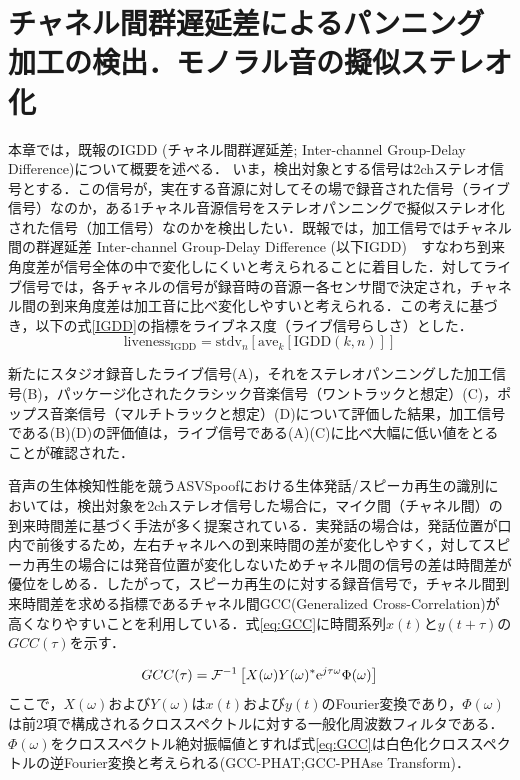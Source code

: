 \documentclass[technicalreport]{ieicej}
\begin{document}
\section{チャネル間群遅延差によるパンニング加工の検出．モノラル音の擬似ステレオ化}
本章では，既報\cite{kuroda_EMM201903}のIGDD (チャネル間群遅延差; Inter-channel Group-Delay Difference)について概要を述べる．
いま，検出対象とする信号は2chステレオ信号とする．この信号が，実在する音源に対してその場で録音された信号（ライブ信号）なのか，ある1チャネル音源信号をステレオパンニングで擬似ステレオ化された信号（加工信号）なのかを検出したい．既報では，加工信号ではチャネル間の群遅延差 Inter-channel Group-Delay Difference (以下IGDD)　すなわち到来角度差が信号全体の中で変化しにくいと考えられることに着目した．対してライブ信号では，各チャネルの信号が録音時の音源ー各センサ間で決定され，チャネル間の到来角度差は加工音に比べ変化しやすいと考えられる．この考えに基づき，以下の式\eqref{IGDD}の指標をライブネス度（ライブ信号らしさ）とした．
\begin{equation}
	\mbox{liveness}_{\mbox{IGDD}} = \mbox{stdv}_n\left[ \mbox{ave}_k[ \mbox{IGDD}(k,n)] \right] \label{IGDD}
\end{equation}

新たにスタジオ録音したライブ信号(A)，それをステレオパンニングした加工信号(B)，パッケージ化されたクラシック音楽信号（ワントラックと想定）(C)，ポップス音楽信号（マルチトラックと想定）(D)について評価した結果，加工信号である(B)(D)の評価値は，ライブ信号である(A)(C)に比べ大幅に低い値をとることが確認された．

音声の生体検知性能を競うASVSpoofにおける生体発話/スピーカ再生の識別においては，検出対象を2chステレオ信号した場合に，マイク間（チャネル間）の到来時間差に基づく手法が多く提案されている．実発話の場合は，発話位置が口内で前後するため，左右チャネルへの到来時間の差が変化しやすく，対してスピーカ再生の場合には発音位置が変化しないためチャネル間の信号の差は時間差が優位をしめる．したがって，スピーカ再生のに対する録音信号で，チャネル間到来時間差を求める指標であるチャネル間GCC(Generalized Cross-Correlation)\cite{GCC}が高くなりやすいことを利用している．式\eqref{eq:GCC}に時間系列$x(t)$と$y(t+\tau)$の$GCC(\tau)$を示す．

\begin{equation}
GCC(\tau) = \mathcal{F}^{-1}\left[X(\omega)Y(\omega)^{*}{\rm e}^{j\tau\omega}\Phi(\omega)\right] \label{eq:GCC}
\end{equation}
ここで，$X(\omega)$および$Y(\omega)$は$x(t)$および$y(t)$のFourier変換であり，$\Phi(\omega)$は前2項で構成されるクロススペクトルに対する一般化周波数フィルタである．$\Phi(\omega)$をクロススペクトル絶対振幅値とすれば式\eqref{eq:GCC}は白色化クロススペクトルの逆Fourier変換と考えられる(GCC-PHAT;GCC-PHAse Transform)．
\end{document}
